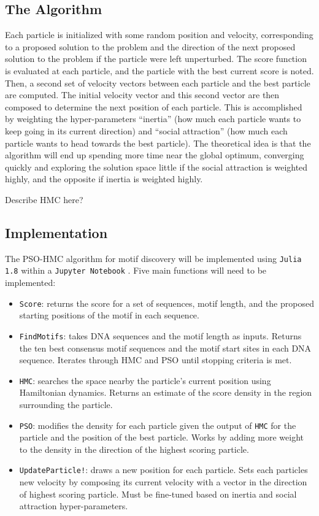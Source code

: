 \documentclass{article}
\begin{document}
\subsection{The Algorithm}
Each particle is initialized with some random position and velocity, corresponding to a proposed solution to the problem and the direction of the next proposed solution to the problem if the particle were left unperturbed. The score function is evaluated at each particle, and the particle with the best current score is noted. Then, a second set of velocity vectors between each particle and the best particle are computed. The initial velocity vector and this second vector are then composed to determine the next position of each particle. This is accomplished by weighting the hyper-parameters ``inertia'' (how much each particle wants to keep going in its current direction) and ``social attraction'' (how much each particle wants to head towards the best particle). The theoretical idea is that the algorithm will end up spending more time near the global optimum, converging quickly and exploring the solution space little if the social attraction is weighted highly, and the opposite if inertia is weighted highly.  
  
Describe HMC here?
\subsection{Implementation}
The PSO-HMC algorithm for motif discovery will be implemented using \texttt{Julia 1.8} \cite{Julia-2017} within a  \texttt{Jupyter Notebook}  \cite{Kluyver2016jupyter}. Five main functions will need to be implemented:
\begin{itemize}
	\item \texttt{Score}: returns the score for a set of sequences, motif length, and the proposed starting positions of the motif in each sequence.
	\item \texttt{FindMotifs}: takes DNA sequences and the motif length as inputs. Returns the ten best consensus motif sequences and the motif start sites in each DNA sequence. Iterates through HMC and PSO until stopping criteria is met.
	\item \texttt{HMC}: searches the space nearby the particle's current position using Hamiltonian dynamics. Returns an estimate of the score density in the region surrounding the particle.
	\item \texttt{PSO}: modifies the density for each particle given the output of \texttt{HMC} for the particle and the position of the best particle. Works by adding more weight to the density in the direction of the highest scoring particle.
	\item \texttt{UpdateParticle!}: draws a new position for each particle. Sets each particles new velocity by composing its current velocity with a vector in the direction of highest scoring particle. Must be fine-tuned based on inertia and social attraction hyper-parameters.
\end{itemize}
\end{document}
